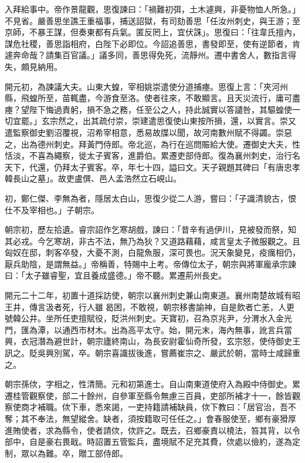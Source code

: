 \begin{pinyinscope}
 入拜給事中。帝作景龍觀，思復諫曰：「禍難初弭，土木遽興，非憂物恤人所急。」不見省。嚴善思坐譙王重福事，捕送詔獄，有司劾善思「任汝州刺史，與王游；至京師，不暴王謀，但奏東都有兵氣。匿反罔上，宜伏誅」。思復曰：「往韋氏擅內，謀危社稷，善思詣相府，白陛下必即位。今詔追善思，書發即至，使有逆節者，肯遽奔命哉？請集百官議。」議多同，善思得免死，流靜州。遷中書舍人，數指言得失，頗見納用。



 開元初，為諫議大夫。山東大蝗，宰相姚崇遣使分道捕瘞。思復上言：「夾河州縣，飛蝗所至，苗輒盡，今游食至洛。使者往來，不敢顯言。且天災流行，庸可盡瘞？望陛下悔過責躬，損不急之務，任至公之人，持此誠實以答譴咎，其驅蝗使一切宜罷。」玄宗然之，出其疏付崇，崇建遣思復使山東按所損，還，以實言。崇又遣監察御史劉沼覆視，沼希宰相意，悉易故牒以聞，故河南數州賦不得蠲。崇惡之，出為德州刺史。拜黃門侍郎。帝北巡，為行在巡問賑給大使。遷御史大夫，性恬淡，不喜為繩察，徙太子賓客，進爵伯。累遷吏部侍郎。復為襄州刺史，治行名天下，代還，仍拜太子賓客。卒，年七十四，謚曰文。天子親題其碑曰「有唐忠孝韓長山之墓」。故吏盧僎、邑人孟浩然立石峴山。



 初，鄭仁傑、李無為者，隱居太白山，思復少從二人游，嘗曰：「子識清貌古，恨仕不及宰相也。」子朝宗。



 朝宗初，歷左拾遺。睿宗詔作乞寒胡戲，諫曰：「昔辛有過伊川，見被發而祭，知其必戎。今乞寒胡，非古不法，無乃為狄？又道路藉藉，咸言皇太子微服觀之。且匈奴在邸，刺客卒發，大憂不測，白龍魚服，深可畏也。況天象變見，疫癘相仍，厭兵助陰，是謂無益。」帝稱善，特賜中上考。帝傳位太子，朝宗與將軍龐承宗諫曰：「太子雖睿聖，宜且養成盛德。」帝不聽。累遷荊州長史。



 開元二十二年，初置十道採訪使，朝宗以襄州刺史兼山南東道。襄州南楚故城有昭王井，傳言汲者死，行人雖曷困，不敢視，朝宗移書諭神，自是飲者亡恙，人更號韓公井。坐所任吏擅賦役，貶洪州刺史。天寶初，召為京兆尹，分渭水入金光門，匯為潭，以通西市材木。出為高平太守。始，開元末，海內無事，訛言兵當興，衣冠潛為避世計，朝宗廬終南山，為長安尉霍仙奇所發，玄宗怒，使侍御史王訊之。貶吳興別駕，卒。朝宗喜識拔後進，嘗薦崔宗之、嚴武於朝，當時士咸歸重之。



 朝宗孫佽，字相之，性清簡。元和初第進士。自山南東道使府入為殿中侍御史。累遷桂管觀察使，部二十餘州，自參軍至縣令無慮三百員，吏部所補才十一，餘皆觀察使商才補職。佽下車，悉來謁，一吏持籍請補缺員，佽下教曰：「居官治，吾不奪；其不奉法，無望縱舍。缺者，須按籍取可任任之。」會春服使至，鄉有豪猾厚進賄使者，求為縣令，使者請佽，佽許之。既去，召鄉豪責以橈法，笞其背，以令部中，自是豪右畏戢。時詔置五管監兵，盡境賦不足充其費，佽處以儉約，遂為定制，眾以為難。卒，贈工部侍郎。




\end{pinyinscope}
